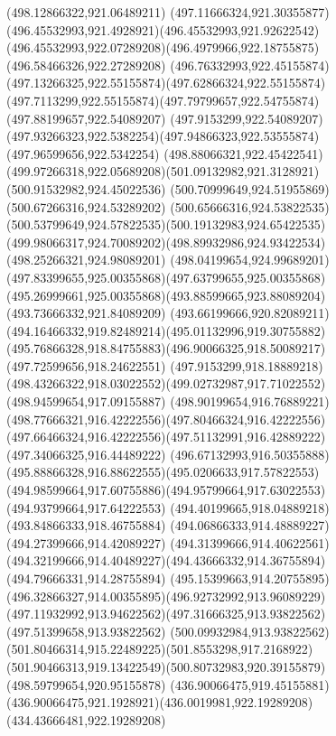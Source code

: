 {{{{				\lineto(498.12866322,921.06489211)
				\curveto(497.11666324,921.30355877)(496.45532993,921.4928921)(496.45532993,921.92622542)
				\curveto(496.45532993,922.07289208)(496.4979966,922.18755875)(496.58466326,922.27289208)
				\curveto(496.76332993,922.45155874)(497.13266325,922.55155874)(497.62866324,922.55155874)
				\curveto(497.7113299,922.55155874)(497.79799657,922.54755874)(497.88199657,922.54089207)
				\lineto(497.9153299,922.54089207)
				\curveto(497.93266323,922.5382254)(497.94866323,922.53555874)(497.96599656,922.5342254)
				\curveto(498.88066321,922.45422541)(499.97266318,922.05689208)(501.09132982,921.3128921)
				\lineto(500.91532982,924.45022536)
				\lineto(500.70999649,924.51955869)
				\lineto(500.67266316,924.53289202)
				\curveto(500.65666316,924.53822535)(500.53799649,924.57822535)(500.19132983,924.65422535)
				\curveto(499.98066317,924.70089202)(498.89932986,924.93422534)(498.25266321,924.98089201)
				\curveto(498.04199654,924.99689201)(497.83399655,925.00355868)(497.63799655,925.00355868)
				\curveto(495.26999661,925.00355868)(493.88599665,923.88089204)(493.73666332,921.84089209)
				\curveto(493.66199666,920.82089211)(494.16466332,919.82489214)(495.01132996,919.30755882)
				\curveto(495.76866328,918.84755883)(496.90066325,918.50089217)(497.72599656,918.24622551)
				\lineto(497.9153299,918.18889218)
				\curveto(498.43266322,918.03022552)(499.02732987,917.71022552)(498.94599654,917.09155887)
				\curveto(498.90199654,916.76889221)(498.77666321,916.42222556)(497.80466324,916.42222556)
				\curveto(497.66466324,916.42222556)(497.51132991,916.42889222)(497.34066325,916.44489222)
				\curveto(496.67132993,916.50355888)(495.88866328,916.88622555)(495.0206633,917.57822553)
				\curveto(494.98599664,917.60755886)(494.95799664,917.63022553)(494.93799664,917.64222553)
				\lineto(494.40199665,918.04889218)
				\lineto(493.84866333,918.46755884)
				\lineto(494.06866333,914.48889227)
				\lineto(494.27399666,914.42089227)
				\lineto(494.31399666,914.40622561)
				\curveto(494.32199666,914.40489227)(494.43666332,914.36755894)(494.79666331,914.28755894)
				\curveto(495.15399663,914.20755895)(496.32866327,914.00355895)(496.92732992,913.96089229)
				\curveto(497.11932992,913.94622562)(497.31666325,913.93822562)(497.51399658,913.93822562)
				\curveto(500.09932984,913.93822562)(501.80466314,915.22489225)(501.8553298,917.2168922)
				\curveto(501.90466313,919.13422549)(500.80732983,920.39155879)(498.59799654,920.95155878)
				\moveto(436.90066475,919.45155881)
				\curveto(436.90066475,921.1928921)(436.0019981,922.19289208)(434.43666481,922.19289208)
}}}}
